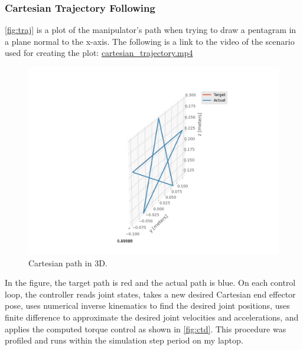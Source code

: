 \documentclass{article}
\begin{document}
\subsubsection{Cartesian Trajectory Following}

\autoref{fig:traj} is a plot of the manipulator's path when trying to draw a pentagram in a plane
normal to the x-axis.
The following is a link to the video of the scenario used for creating the plot:
\href{./media/cartesian\_trajectory.mp4}{cartesian\_trajectory.mp4}
\begin{figure}[h]
  \centering
  \includegraphics[width=0.75\linewidth]{media/cartesian_trajectory}
  \caption{Cartesian path in 3D.}
  \label{fig:traj}
\end{figure}
In the figure, the target path is red and the actual path is blue.
On each control loop,
the controller reads joint states,
takes a new desired Cartesian end effector pose,
uses numerical inverse kinematics to find the desired joint positions,
uses finite difference to approximate the desired joint velocities and accelerations,
and applies the computed torque control as shown in \autoref{fig:ctd}.
This procedure was profiled and runs within the simulation step period on my laptop.
\end{document}
